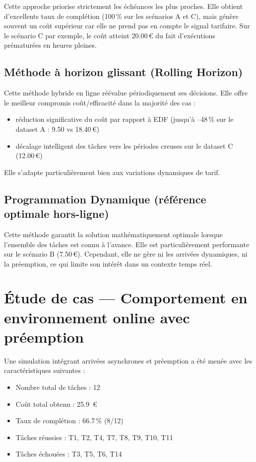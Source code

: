 \documentclass[12pt,a4paper]{report}
\begin{document}
Cette approche priorise strictement les échéances les plus proches. Elle obtient d’excellents taux de complétion (100\,\% sur les scénarios A et C), mais génère souvent un coût supérieur car elle ne prend pas en compte le signal tarifaire. Sur le scénario C par exemple, le coût atteint 20.00\,€ du fait d’exécutions prématurées en heures pleines.

\subsection{Méthode à horizon glissant (Rolling Horizon)}

Cette méthode hybride en ligne réévalue périodiquement ses décisions. Elle offre le meilleur compromis coût/efficacité dans la majorité des cas :
\begin{itemize}
    \item réduction significative du coût par rapport à EDF (jusqu’à –48\,\% sur le dataset A : 9.50 vs 18.40\,€)
    \item décalage intelligent des tâches vers les périodes creuses sur le dataset C (12.00\,€)
\end{itemize}
Elle s’adapte particulièrement bien aux variations dynamiques de tarif.

\subsection{Programmation Dynamique (référence optimale hors-ligne)}

Cette méthode garantit la solution mathématiquement optimale lorsque l’ensemble des tâches est connu à l’avance. Elle est particulièrement performante sur le scénario B (7.50\,€). Cependant, elle ne gère ni les arrivées dynamiques, ni la préemption, ce qui limite son intérêt dans un contexte temps réel.

\section{Étude de cas — Comportement en environnement online avec préemption}

Une simulation intégrant arrivées asynchrones et préemption a été menée avec les caractéristiques suivantes :

\begin{itemize}
    \item Nombre total de tâches : 12
    \item Coût total obtenu : \SI{25.9}{\euro}
    \item Taux de complétion : 66.7\,\% (8/12)
    \item Tâches réussies : T1, T2, T4, T7, T8, T9, T10, T11
    \item Tâches échouées : T3, T5, T6, T14
\end{itemize}
\end{document}
